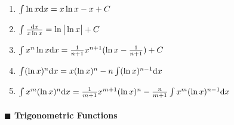 \begin{enumerate}

\item $ \int \ln x \mathrm{d} x = x \ln x - x + C$

\item $ \int \frac{\mathrm{d} x}{x \ln x} =\ln \big | \ln x \big |+C $

\item $ \int x^n \ln x \mathrm{d} x = \frac{1}{n+1}x^{n+1}(\ln x - \frac{1}{n+1} ) +C $

\item $ \int (\ln x)^{n} \mathrm{d} x = x(\ln x)^ n - n \int (\ln x)^{n-1} \mathrm{d} x $

\item $ \int x ^ m(\ln x)^n \mathrm{d} x=\frac{1}{m+1}x^{m+1} (\ln x)^n - \frac{n}{m+1} \int x^m(\ln x)^{n-1}\mathrm{d} x $

\end{enumerate}

\paragraph{$\blacksquare$ Trigonometric Functions}


